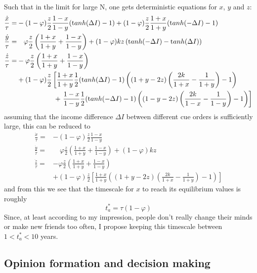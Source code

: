 Such that in the limit for large N, one gets deterministic equations for $x$, $y$ and $z$:
\begin{align}
	\frac{\dot{x}}{\tau} =& -(1-\varphi)\frac{z}{2}\frac{1-x}{1-y}({\mathrm tanh}(\Delta I)-1) + (1-\varphi)\frac{z}{2}\frac{1+x}{1+y}({\mathrm tanh}(-\Delta I)-1) \\
\frac{\dot{y}}{\tau} =& \quad \varphi\frac{z}{2}\left( \frac{1+x}{1+y} + \frac{1-x}{1-y} \right) + (1-\varphi)kz\left( {\mathrm tanh}(-\Delta I) - {\mathrm tanh}(\Delta I) \right) \\
	\frac{\dot{z}}{\tau} =& -\varphi\frac{z}{2}\left( \frac{1+x}{1+y} + \frac{1-x}{1-y} \right) \nonumber \\
	& + (1-\varphi)\frac{z}{2} \left[ \frac{1+x}{1+y} \frac{1}{2}({\mathrm tanh}(\Delta I)-1) \left( (1+y-2z)\left( \frac{2k}{1+x}-\frac{1}{1+y} \right)-1 \right) \right. \nonumber \\
	& \hspace{1.9 cm} + \left.\frac{1-x}{1-y}\frac{1}{2}({\mathrm tanh}(-\Delta I)-1)\left( (1-y-2z)\left( \frac{2k}{1-x}-\frac{1}{1-y} \right)-1 \right)  \right]
	\label{avm_ode}
\end{align}
assuming that the income difference $\Delta I$ between different cue orders is sufficiently large, this can be reduced to
\begin{align}
	\frac{\dot{x}}{\tau} =& -(1-\varphi)\frac{z}{2}\frac{1-x}{1-y} \\
\frac{\dot{y}}{\tau} =& \quad \varphi\frac{z}{2}\left( \frac{1+x}{1+y} + \frac{1-x}{1-y} \right) + (1-\varphi)kz \\
	\frac{\dot{z}}{\tau} =& -\varphi\frac{z}{2}\left( \frac{1+x}{1+y} + \frac{1-x}{1-y} \right) \nonumber \\
	& + (1-\varphi)\frac{z}{2} \left[ \frac{1+x}{1+y} \left( (1+y-2z)\left( \frac{2k}{1+x}-\frac{1}{1+y} \right)-1 \right) \right]
	\label{avm_ode_reduced}
\end{align}
and from this we see that the timescale for $x$ to reach its equilibrium values is roughly 
\begin{equation}
	t_a^* = \tau(1-\varphi)
	\label{avm_timescale}
\end{equation}
Since, at least according to my impression, people don't really change their minds or make new friends too often, I propose keeping this timescale between $1<t_a^*<10$ years.
\fi
\newpage
\subsection{Opinion formation and decision making}
\label{sec:oppinion_formation_and_decision_making}


